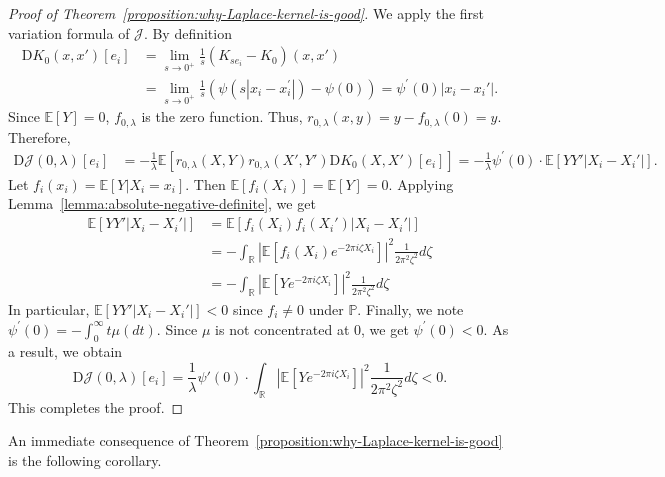 \documentclass[sn-mathphys-num]{sn-jnl}%
\numberwithin{equation}{section}
\newcommand{\R}{\mathbb{R}}
\newcommand{\E}{\mathbb{E}}
\newcommand{\kernel}{K}
\renewcommand{\P}{\mathbb{P}}
\newcommand{\profile}{\psi}
\theoremstyle{thmstyleone}%
\theoremstyle{thmstyletwo}%
\theoremstyle{thmstylethree}%
\begin{document}
\begin{proof}[Proof of Theorem~\ref{proposition:why-Laplace-kernel-is-good}] 
We apply the first variation formula of $\mathcal{J}$. By definition 
\begin{equation*}
\begin{split} 
	\mathrm{D} \kernel_0(x, x')[e_i] &= \lim_{s \to 0^+} \frac{1}{s} (\kernel_{se_i} - \kernel_{0})(x, x') \\
		&= \lim_{s \to 0^+} \frac{1}{s} (\profile(s |x_i - x_i^\prime|) - \profile(0)) = \profile^\prime(0)|x_i - x_i'|.
\end{split} 
\end{equation*}
Since $\E[Y] = 0$, $f_{0, \lambda}$ is the zero function. Thus, $r_{0, \lambda}(x, y) = y - f_{0, \lambda}(0) = y$. Therefore, 
\begin{equation*}
\begin{split} 
	\mathrm{D}\mathcal{J}(0, \lambda)[e_i] &= -\frac{1}{\lambda}
		\E[r_{0, \lambda}(X, Y) r_{0, \lambda}(X', Y') \mathrm{D} \kernel_0(X, X')[e_i] ] = -\frac{1}{\lambda} \profile^\prime(0) \cdot \E[YY' |X_i - X_i'|]. 
\end{split}
\end{equation*}
Let $f_i(x_i) = \E[Y|X_i = x_i]$. Then $\E[f_i(X_i)] = \E[Y] = 0$.  Applying Lemma~\ref{lemma:absolute-negative-definite}, we get  
\begin{equation*}
\begin{split} 
	\E[YY'|X_i - X_i'|] &= \E[f_i(X_i) f_i(X_i') |X_i - X_i'|] \\
		&= - \int_\R \left|\E[f_i(X_i) e^{-2\pi i\zeta X_i}]\right|^2 \frac{1}{2\pi^2 \zeta^2} d\zeta \\
		&=  -\int_\R \left|\E[Y e^{-2\pi i\zeta X_i}]\right|^2 \frac{1}{2\pi^2 \zeta^2} d\zeta 
\end{split} 
\end{equation*} 
In particular, $\E[YY'|X_i - X_i'|] < 0$ since $f_i \neq 0$ under $\P$. Finally, we note $
	\profile^\prime(0) = -\int_0^\infty t \mu(dt)$.   
Since $\mu$ is not concentrated at $0$, we get  $\profile^\prime(0) < 0$.  As a result, we obtain 
\[
	\mathrm{D}\mathcal{J}(0, \lambda)[e_i] = \frac{1}{\lambda} \profile'(0) \cdot \int_\R \left|\E[Y e^{-2\pi i \zeta X_i}]\right|^2 \frac{1}{2\pi^2 \zeta^2} d\zeta < 0.
\]
This completes the proof.
\end{proof} 

An immediate consequence of Theorem~\ref{proposition:why-Laplace-kernel-is-good} is the following corollary.
\end{document}

